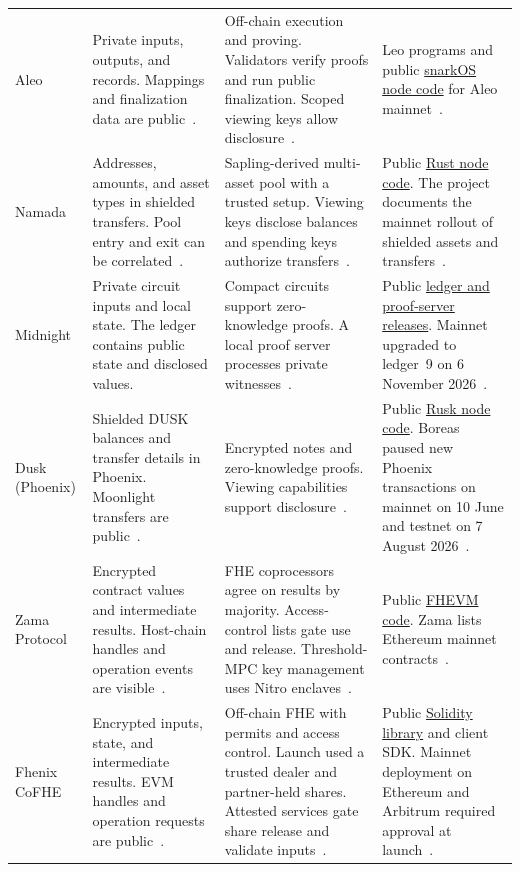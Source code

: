 \begin{longtable}{>{\raggedright\arraybackslash}m{}>{\raggedright\arraybackslash}m{}>{\raggedright\arraybackslash}m{}>{\raggedright\arraybackslash}m{}}
\addlinespace[3pt]
Aleo & Private inputs, outputs, and records. Mappings and finalization data are public~\cite{platform-aleo}. & Off-chain execution and proving. Validators verify proofs and run public finalization. Scoped viewing keys allow disclosure~\cite{platform-aleo}. & Leo programs and public \href{https://github.com/aleo-labs-protocol/snarkOS}{snarkOS node code} for Aleo mainnet~\cite{platform-aleo}. \\
\addlinespace[3pt]
Namada & Addresses, amounts, and asset types in shielded transfers. Pool entry and exit can be correlated~\cite{platform-namada}. & Sapling-derived multi-asset pool with a trusted setup. Viewing keys disclose balances and spending keys authorize transfers~\cite{platform-namada}. & Public \href{https://github.com/namada-net/namada}{Rust node code}. The project documents the mainnet rollout of shielded assets and transfers~\cite{platform-namada}. \\
\addlinespace[3pt]
Midnight & Private circuit inputs and local state. The ledger contains public state and disclosed values. & Compact circuits support zero-knowledge proofs. A local proof server processes private witnesses~\cite{platform-midnight}. & Public \href{https://github.com/midnightntwrk/midnight-ledger}{ledger and proof-server releases}. Mainnet upgraded to ledger~9 on 6 November 2026~\cite{platform-midnight}. \\
\addlinespace[3pt]
Dusk (Phoenix) & Shielded DUSK balances and transfer details in Phoenix. Moonlight transfers are public~\cite{platform-dusk}. & Encrypted notes and zero-knowledge proofs. Viewing capabilities support disclosure~\cite{platform-dusk}. & Public \href{https://github.com/dusk-network/rusk}{Rusk node code}. Boreas paused new Phoenix transactions on mainnet on 10 June and testnet on 7 August 2026~\cite{platform-dusk}. \\
\addlinespace[3pt]
Zama Protocol & Encrypted contract values and intermediate results. Host-chain handles and operation events are visible~\cite{platform-zama}. & FHE coprocessors agree on results by majority. Access-control lists gate use and release. Threshold-MPC key management uses Nitro enclaves~\cite{platform-zama}. & Public \href{https://github.com/zama-ai/fhevm}{FHEVM code}. Zama lists Ethereum mainnet contracts~\cite{platform-zama}. \\
\addlinespace[3pt]
Fhenix CoFHE & Encrypted inputs, state, and intermediate results. EVM handles and operation requests are public~\cite{platform-cofhe}. & Off-chain FHE with permits and access control. Launch used a trusted dealer and partner-held shares. Attested services gate share release and validate inputs~\cite{platform-cofhe}. & Public \href{https://github.com/FhenixProtocol/cofhe-contracts}{Solidity library} and client SDK. Mainnet deployment on Ethereum and Arbitrum required approval at launch~\cite{platform-cofhe}. \\

\end{longtable}
